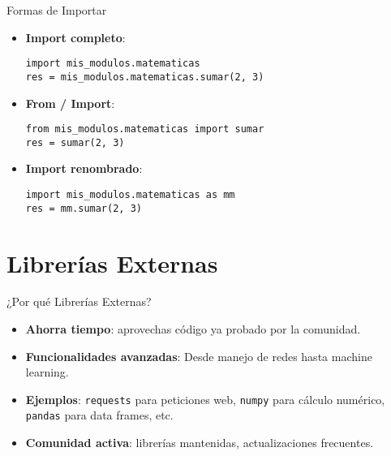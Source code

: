 \documentclass[10pt]{beamer}
\begin{document}
\begin{frame}[fragile]{Formas de Importar}
\begin{itemize}
  \item \textbf{Import completo}:
  \begin{verbatim}
import mis_modulos.matematicas
res = mis_modulos.matematicas.sumar(2, 3)
  \end{verbatim}
  \item \textbf{From / Import}:
  \begin{verbatim}
from mis_modulos.matematicas import sumar
res = sumar(2, 3)
  \end{verbatim}
  \item \textbf{Import renombrado}:
  \begin{verbatim}
import mis_modulos.matematicas as mm
res = mm.sumar(2, 3)
  \end{verbatim}
\end{itemize}
\end{frame}

\section{Librerías Externas}

\begin{frame}{¿Por qué Librerías Externas?}
  \begin{itemize}
    \item \textbf{Ahorra tiempo}: aprovechas código ya probado por la comunidad.
    \item \textbf{Funcionalidades avanzadas}: Desde manejo de redes hasta machine learning.
    \item \textbf{Ejemplos}: \texttt{requests} para peticiones web, \texttt{numpy} para cálculo numérico, \texttt{pandas} para data frames, etc.
    \item \textbf{Comunidad activa}: librerías mantenidas, actualizaciones frecuentes.
  \end{itemize}
\end{frame}
\end{document}
